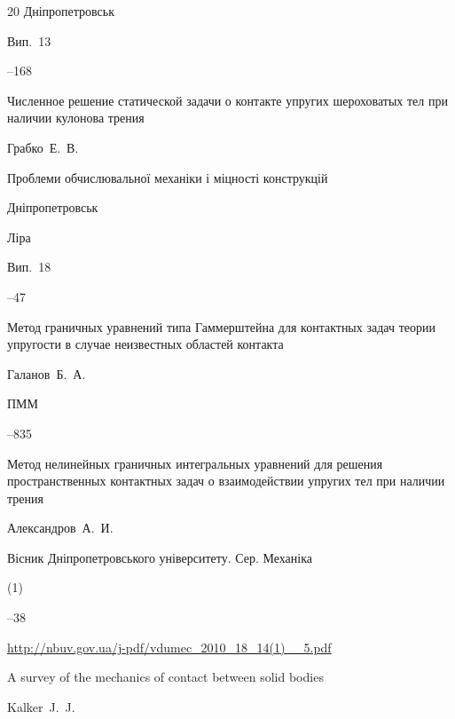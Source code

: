 \begin{thebibliography}{20}
\publaddr Дніпропетровськ


\issueinfo Вип.~13

--168




\paper Численное решение статической задачи о контакте упругих шероховатых тел при наличии кулонова трения

\by Грабко~Е.~В.

\serial Проблеми обчислювальної механіки і міцності конструкцій

\publaddr Дніпропетровськ

\publ Ліра


\volinfo Вип.~18

--47




\paper Метод граничных уравнений типа Гаммерштейна для контактных задач теории упругости в случае неизвестных областей контакта

\by Галанов~Б.~А.

\jour ПММ




--835




\paper Метод нелинейных граничных интегральных уравнений для решения пространственных контактных задач о взаимодействии упругих тел при наличии трения

\by Александров~А.~И.

\jour Вісник Дніпропетровського університету. Сер. Механіка



(1)

--38

\elink \url{http://nbuv.gov.ua/j-pdf/vdumec_2010_18_14(1)__5.pdf}






\paper A survey of the mechanics of contact between solid bodies

\by Kalker~J.~J.


\end{thebibliography}
